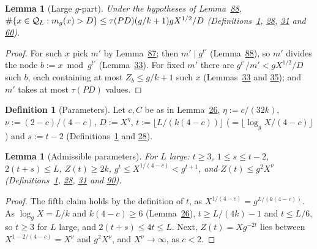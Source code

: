 \documentclass[11pt]{article}
\newcounter{hffc}
\theoremstyle{definition}\newtheorem{hffdef}[hffc]{Definition}
\theoremstyle{plain}\newtheorem{hfflem}[hffc]{Lemma}\newtheorem{hffthm}[hffc]{Theorem}
\theoremstyle{remark}\newtheorem{hffrem}[hffc]{Remark}
\newcommand{\hffcost}{}
\newcommand{\setcost}[1]{\renewcommand{\hffcost}{#1}}
\begin{document}
\begin{hfflem}[Large $g$-part]\label{L:largeg}
Under the hypotheses of Lemma~\hyperref[L:level]{88}, $\#\{x\in\mathcal{Q}_L:m_g(x)>D\}\le\tau(PD)(g/k+1)gX^{1/2}/D$ (Definitions~\hyperref[D:conv]{1}, \hyperref[D:pal]{28}, \hyperref[D:node]{31} and \hyperref[D:gpart]{60}).
\par\nopagebreak{}
\end{hfflem}
\begin{proof}\setcost{length 197/300}For such $x$ pick $m'$ by Lemma~\hyperref[L:mdiv]{87}; then $m'\mid g^{t'}$ (Lemma~\hyperref[L:level]{88}), so $m'$ divides the node $b:=x\bmod g^{t'}$ (Lemma~\hyperref[L:tree]{33}). For fixed $m'$ there are $g^{t'}/m'<gX^{1/2}/D$ such $b$, each containing at most $Z_b\le g/k+1$ such $x$ (Lemmas~\hyperref[L:tree]{33} and \hyperref[L:sizes]{35}); and $m'$ takes at most $\tau(PD)$ values.
\end{proof}

\begin{hffdef}[Parameters]\label{D:par}
Let $c,C$ be as in Lemma~\hyperref[L:saving]{26}, $\eta:=c/(32k)$, $\nu:=(2-c)/(4-c)$, $D:=X^\eta$, $t:=\lfloor L/(k(4-c))\rfloor$ ($=\lfloor\log_gX/(4-c)\rfloor$) and $s:=t-2$ (Definitions~\hyperref[D:conv]{1} and \hyperref[D:pal]{28}).
\par\nopagebreak{}
\end{hffdef}

\begin{hfflem}[Admissible parameters]\label{L:adm}
For $L$ large: $t\ge3$, $1\le s\le t-2$, $2(t+s)\le L$, $Z(t)\ge2k$, $g^t\le X^{1/(4-c)}<g^{t+1}$, and $Z(t)\le g^2X^\nu$ (Definitions~\hyperref[D:conv]{1}, \hyperref[D:pal]{28}, \hyperref[D:node]{31} and \hyperref[D:par]{90}).
\par\nopagebreak{}
\end{hfflem}
\begin{proof}\setcost{length 202/300}The fifth claim holds by the definition of $t$, as $X^{1/(4-c)}=g^{L/(k(4-c))}$. As $\log_gX=L/k$ and $k(4-c)\ge6$ (Lemma~\hyperref[L:saving]{26}), $t\ge L/(4k)-1$ and $t\le L/6$, so $t\ge3$ for $L$ large, and $2(t+s)\le4t\le L$. Next, $Z(t)=Xg^{-2t}$ lies between $X^{1-2/(4-c)}=X^\nu$ and $g^2X^\nu$, and $X^\nu\to\infty$, as $c<2$.
\end{proof}
\end{document}
